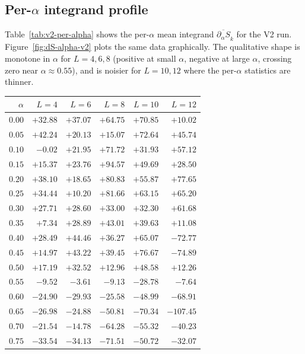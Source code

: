 \documentclass[11pt,a4paper]{article}
\theoremstyle{definition}
\begin{document}
\subsection{Per-$\alpha$ integrand profile}
\label{sec:per-alpha}

Table~\ref{tab:v2-per-alpha} shows the per-$\alpha$ mean integrand
$\overline{\partial_\alpha S}_k$ for the V2 run.
Figure~\ref{fig:dS-alpha-v2} plots the same data graphically. The
qualitative shape is monotone in $\alpha$ for $L = 4, 6, 8$ (positive
at small $\alpha$, negative at large $\alpha$, crossing zero near
$\alpha \approx 0.55$), and is noisier for $L = 10, 12$ where the
per-$\alpha$ statistics are thinner.

\begin{table}[p]
\centering
\small
\begin{tabular}{rrrrrr}
\toprule
$\alpha$ & $L=4$ & $L=6$ & $L=8$ & $L=10$ & $L=12$ \\
\midrule
$0.00$ & $+32.88$ & $+37.07$ & $+64.75$ & $+70.85$ & $+10.02$ \\
$0.05$ & $+42.24$ & $+20.13$ & $+15.07$ & $+72.64$ & $+45.74$ \\
$0.10$ & $-0.02$  & $+21.95$ & $+71.72$ & $+31.93$ & $+57.12$ \\
$0.15$ & $+15.37$ & $+23.76$ & $+94.57$ & $+49.69$ & $+28.50$ \\
$0.20$ & $+38.10$ & $+18.65$ & $+80.83$ & $+55.87$ & $+77.65$ \\
$0.25$ & $+34.44$ & $+10.20$ & $+81.66$ & $+63.15$ & $+65.20$ \\
$0.30$ & $+27.71$ & $+28.60$ & $+33.00$ & $+32.30$ & $+61.68$ \\
$0.35$ & $+7.34$  & $+28.89$ & $+43.01$ & $+39.63$ & $+11.08$ \\
$0.40$ & $+28.49$ & $+44.46$ & $+36.27$ & $+65.07$ & $-72.77$ \\
$0.45$ & $+14.97$ & $+43.22$ & $+39.45$ & $+76.67$ & $-74.89$ \\
$0.50$ & $+17.19$ & $+32.52$ & $+12.96$ & $+48.58$ & $+12.26$ \\
$0.55$ & $-9.52$  & $-3.61$  & $-9.13$  & $-28.78$ & $-7.64$  \\
$0.60$ & $-24.90$ & $-29.93$ & $-25.58$ & $-48.99$ & $-68.91$ \\
$0.65$ & $-26.98$ & $-24.88$ & $-50.81$ & $-70.34$ & $-107.45$ \\
$0.70$ & $-21.54$ & $-14.78$ & $-64.28$ & $-55.32$ & $-40.23$ \\
$0.75$ & $-33.54$ & $-34.13$ & $-71.51$ & $-50.72$ & $-32.07$ \\

\end{tabular}
\end{table}
\end{document}

